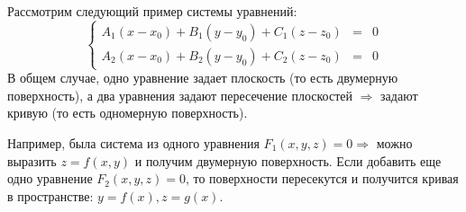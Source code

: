 \documentclass[12pt]{article}
\theoremstyle{definition}
\begin{document}
Рассмотрим следующий пример системы уравнений:
$$
	\left\{
	\begin{array}{ccc}
		A_1(x - x_0) + B_1(y - y_0) + C_1(z - z_0)  & = &  0 \\
		A_2(x - x_0) + B_2(y - y_0) + C_2(z - z_0)  & = &  0
	\end{array}
	\right.
$$
В общем случае, одно уравнение задает плоскость (то есть двумерную поверхность), а два уравнения задают пересечение плоскостей $\Rightarrow$ задают кривую (то есть одномерную поверхность).

Например, была система из одного уравнения $F_1(x,y,z) = 0 \Rightarrow$ можно выразить $z = f(x,y)$ и получим двумерную поверхность. Если добавить еще одно уравнение $F_2(x,y,z) = 0$, то поверхности пересекутся и получится кривая в пространстве: $y = f(x), z = g(x)$. 
\end{document}
